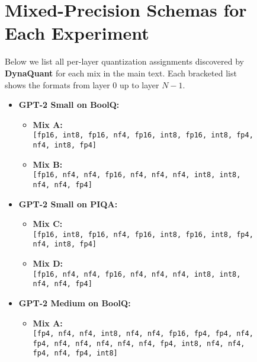 \documentclass{article}
\begin{document}
	\begin{figure}[ht]
	\begin{minipage}[t]{\textwidth} %
	\section{Mixed-Precision Schemas for Each Experiment}
	\label{sec:appendix-schemas}
	{\small %
		
		Below we list all per-layer quantization assignments discovered by \textbf{DynaQuant} 
		for each mix in the main text. Each bracketed list shows
		the formats from layer 0 up to layer \(N-1\).
		
		\begin{itemize}
			\item \textbf{GPT-2 Small on BoolQ:}
			\begin{itemize}
				\item \textbf{Mix A:}\\
				\texttt{[fp16, int8, fp16, nf4, fp16, int8, fp16, int8, fp4, nf4, int8, fp4]}
				
				\item \textbf{Mix B:}\\
				\texttt{[fp16, nf4, nf4, fp16, nf4, nf4, nf4, int8, int8, nf4, nf4, fp4]}
			\end{itemize}
			\item \textbf{GPT-2 Small on PIQA:}
			\begin{itemize}
				\item \textbf{Mix C:}\\
				\texttt{[fp16, int8, fp16, nf4, fp16, int8, fp16, int8, fp4, nf4, int8, fp4]}
				
				\item \textbf{Mix D:}\\
				\texttt{[fp16, nf4, nf4, fp16, nf4, nf4, nf4, int8, int8, nf4, nf4, fp4]}
			\end{itemize}
			\item \textbf{GPT-2 Medium on BoolQ:}
			\begin{itemize}
				\item \textbf{Mix A:}\\
				\texttt{[fp4, nf4, nf4, int8, nf4, nf4, fp16, fp4, fp4, nf4, fp4, nf4, nf4, nf4, nf4, nf4, fp4, int8, nf4, nf4, fp4, nf4, fp4, int8]}
				

\end{itemize}
\end{itemize}}
\end{minipage}
\end{figure}
\end{document}
